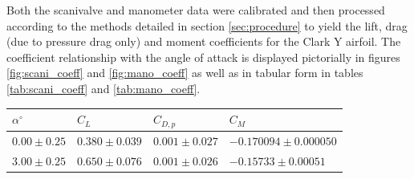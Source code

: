 \documentclass[runningheads]{llncs}
\begin{document}
\noindent
Both the scanivalve and manometer data were calibrated and then processed according to the methods detailed in section \ref{sec:procedure} to yield the lift, drag (due to pressure drag only) and  moment coefficients for the Clark Y airfoil. The coefficient relationship with the angle of attack is displayed pictorially in figures \ref{fig:scani_coeff} and \ref{fig:mano_coeff} as well as in tabular form in tables \ref{tab:scani_coeff} and \ref{tab:mano_coeff}.\newline

\begin{table}[h]
\centering
\begin{tabular}{p{3cm}p{3cm}p{3cm}p{3cm}}
\toprule
$\alpha^\circ$ &                   $C_L$ &               $C_{D,p}$ &                    $C_M$ \\
\midrule
 $0.00\pm0.25$ & $0.380\pm0.039$ & $0.001\pm0.027$ &  $-0.170094\pm0.000050$ \\
 $3.00\pm0.25$ & $0.650\pm0.076$ & $0.001\pm0.026$ & $-0.15733\pm0.00051$ \\

\end{tabular}
\end{table}
\end{document}
